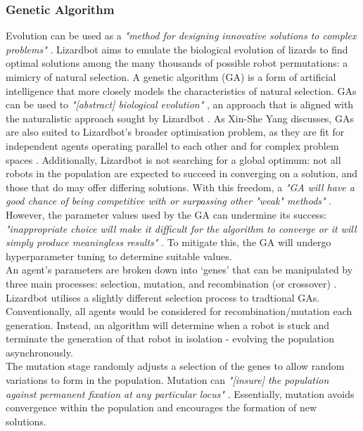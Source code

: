 \documentclass{article}
\begin{document}
\subsubsection{Genetic Algorithm}
\label{sec:Genetic Algorithm Aims}
Evolution can be used as a \textit{"method for designing innovative solutions to complex problems"} . Lizardbot aims to emulate the biological evolution of lizards to find optimal solutions among the many thousands of possible robot permutations: a mimicry of natural selection. A genetic algorithm (GA) is a form of artificial intelligence that more closely models the characteristics of natural selection. GAs can be used to \textit{"[abstract] biological evolution"} , an approach that is aligned with the naturalistic approach sought by Lizardbot . As Xin-She Yang discusses, GAs are also suited to Lizardbot's broader optimisation problem, as they are fit for independent agents operating parallel to each other and for complex problem spaces . Additionally, Lizardbot is not searching for a global optimum: not all robots in the population are expected to succeed in converging on a solution, and those that do may offer differing solutions. With this freedom, a \textit{"GA will have a good chance of being competitive with or surpassing other "weak" methods"} . However, the parameter values used by the GA can undermine its success: \textit{"inappropriate choice will make it difficult for the algorithm to converge or it will simply produce meaningless results"} . To mitigate this, the GA will undergo hyperparameter tuning to determine suitable values.\\

An agent’s parameters are broken down into ‘genes’ that can be manipulated by three main processes: selection, mutation, and recombination (or crossover) . \\

\noindent Lizardbot utilises a slightly different selection process to tradtional GAs. Conventionally, all agents would be considered for recombination/mutation each generation. Instead, an algorithm will determine when a robot is stuck and terminate the generation of that robot in isolation - evolving the population asynchronously. \\

\noindent The mutation stage randomly adjusts a selection of the genes to allow  random variations to form in the population. Mutation can \textit{"[insure]
the population against permanent fixation at any particular locus"} . Essentially, mutation avoids convergence within the population and encourages the formation of new solutions. \\
\end{document}
